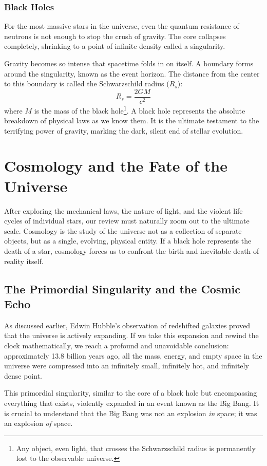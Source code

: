 \documentclass[10pt,a4paper]{article}
\begin{document}
\subsubsection{Black Holes}
For the most massive stars in the universe, even the quantum resistance of neutrons is not enough to stop the crush of gravity. The core collapses completely, shrinking to a point of infinite density called a singularity. 

Gravity becomes so intense that spacetime folds in on itself. A boundary forms around the singularity, known as the event horizon. The distance from the center to this boundary is called the Schwarzschild radius ($R_s$):
$$R_s = \frac{2GM}{c^2}$$
where $M$ is the mass of the black hole\footnote{ Any object, even light, that crosses the Schwarzschild radius is permanently lost to the observable universe.}. A black hole represents the absolute breakdown of physical laws as we know them. It is the ultimate testament to the terrifying power of gravity, marking the dark, silent end of stellar evolution.

\section{Cosmology and the Fate of the Universe}
After exploring the mechanical laws, the nature of light, and the violent life cycles of individual stars, our review must naturally zoom out to the ultimate scale. Cosmology is the study of the universe not as a collection of separate objects, but as a single, evolving, physical entity. If a black hole represents the death of a star, cosmology forces us to confront the birth and inevitable death of reality itself.

\subsection{The Primordial Singularity and the Cosmic Echo}
As discussed earlier, Edwin Hubble's observation of redshifted galaxies proved that the universe is actively expanding. If we take this expansion and rewind the clock mathematically, we reach a profound and unavoidable conclusion: approximately 13.8 billion years ago, all the mass, energy, and empty space in the universe were compressed into an infinitely small, infinitely hot, and infinitely dense point. 

This primordial singularity, similar to the core of a black hole but encompassing everything that exists, violently expanded in an event known as the Big Bang. It is crucial to understand that the Big Bang was not an explosion \textit{in} space; it was an explosion \textit{of} space. 
\end{document}
